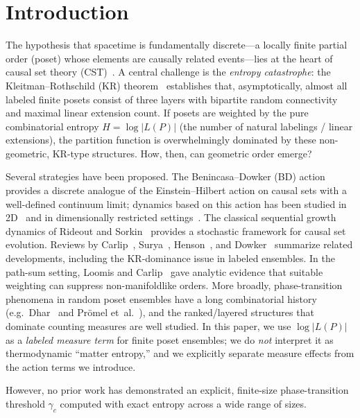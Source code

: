 \documentclass[12pt,a4paper]{article}
\begin{document}
\section{Introduction}
\label{sec:intro}

The hypothesis that spacetime is fundamentally discrete---a locally finite
partial order (poset) whose elements are causally related events---lies at the
heart of causal set theory (CST)~\cite{bombelli1987,sorkin2005}. A central
challenge is the \emph{entropy catastrophe}: the Kleitman--Rothschild (KR)
theorem~\cite{kleitman1975} establishes that, asymptotically, almost all labeled
finite posets consist of three layers with bipartite random connectivity and
maximal linear extension count. If posets are weighted by the pure combinatorial
entropy $H = \log|L(P)|$ (the number of natural labelings / linear extensions),
the partition function is overwhelmingly dominated by
these non-geometric, KR-type structures. How, then, can geometric order emerge?

Several strategies have been proposed. The Benincasa--Dowker (BD)
action~\cite{benincasa2010,benincasa2011} provides a discrete analogue of the
Einstein--Hilbert action on causal sets with a well-defined continuum limit;
dynamics based on this action has been studied in
2D~\cite{surya2012,loomis2018} and in dimensionally restricted
settings~\cite{cunningham2020}. The classical sequential growth dynamics of
Rideout and Sorkin~\cite{rideout2000} provides a stochastic framework for
causal set evolution. Reviews by Carlip~\cite{carlip2017}, Surya~\cite{surya2019},
Henson~\cite{henson2006}, and Dowker~\cite{dowker2005} summarize related
developments, including the KR-dominance issue in labeled ensembles.
In the path-sum setting, Loomis and Carlip~\cite{loomis2018} gave analytic
evidence that suitable weighting can suppress non-manifoldlike orders.
More broadly, phase-transition phenomena in random poset ensembles have a
long combinatorial history (e.g.\ Dhar~\cite{dhar1978} and Pr\"omel
et~al.~\cite{promel2001}), and the ranked/layered structures that dominate
counting measures are well studied.
In this paper, we use $\log|L(P)|$ as a \emph{labeled measure term} for finite
poset ensembles; we do \emph{not} interpret it as thermodynamic ``matter
entropy,'' and we explicitly separate measure effects from the action terms we
introduce.

However, no prior work has demonstrated an explicit, finite-size
phase-transition threshold $\gamma_c$ computed with exact entropy across a wide
range of sizes.
\end{document}
